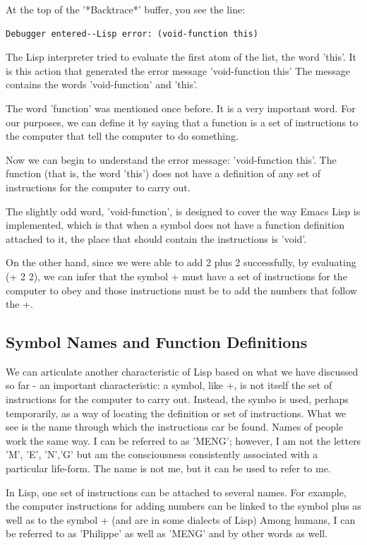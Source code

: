 \documentclass[12pt]{book}
\begin{document}
At the top of the '*Backtrace*' buffer, you see the line:
\begin{Verbatim}
Debugger entered--Lisp error: (void-function this)
\end{Verbatim}
The Lisp interpreter tried to evaluate the first atom of the list, the word 'this'. It is this action that generated the error message 'void-function this' The message contains the words 'void-function' and 'this'.

The word 'function' was mentioned once before. It is a very important word. For our purposes, we can define it by saying that a function is a set of instructions to the computer that tell the computer to do something.

Now we can begin to understand the error message: 'void-function this'. The function (that is, the word 'this') does not have a definition of any set of instructions for the computer to carry out.

The slightly odd word, 'void-function', is designed to cover the way Emacs Lisp is implemented, which is that when a symbol does not have a function definition attached to it, the place that should contain the instructions is 'void'.

On the other hand, since we were able to add 2 plus 2 successfully, by evaluating (+ 2 2), we can infer that the symbol + must have a set of instructions for the computer to obey and those instructions must be to add the numbers that follow the +.


\subsection{Symbol Names and Function Definitions}
We can articulate another characteristic of Lisp based on what we have discussed so far - an important characteristic: a symbol, like +, is not itself the set of instructions for the computer to carry out. Instead, the symbo is used, perhaps temporarily, as a way of locating the definition or set of instructions. What we see is the name through which the instructions car be found. Names of people work the same way. I can be referred to as 'MENG'; however, I am not the letters 'M', 'E', 'N','G' but am the consciousness consistently associated with a particular life-form. The name is not me, but it can be used to refer to me.

In Lisp, one set of instructions can be attached to several names. For example, the computer instructions for adding numbers can be linked to the symbol plus as well as to the symbol + (and are in some dialects of Lisp) Among humans, I can be referred to as 'Philippe' as well as 'MENG' and by other words as well.
\end{document}
